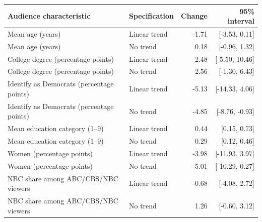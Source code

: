 \begin{tabular}{llrr}
\toprule
Audience characteristic & Specification & Change & 95\% interval \\
\midrule
Mean age (years) & Linear trend & -1.71 & [-3.53, 0.11] \\
Mean age (years) & No trend & 0.18 & [-0.96, 1.32] \\
College degree (percentage points) & Linear trend & 2.48 & [-5.50, 10.46] \\
College degree (percentage points) & No trend & 2.56 & [-1.30, 6.43] \\
Identify as Democrats (percentage points) & Linear trend & -5.13 & [-14.33, 4.06] \\
Identify as Democrats (percentage points) & No trend & -4.85 & [-8.76, -0.93] \\
Mean education category (1--9) & Linear trend & 0.44 & [0.15, 0.73] \\
Mean education category (1--9) & No trend & 0.29 & [0.12, 0.46] \\
Women (percentage points) & Linear trend & -3.98 & [-11.93, 3.97] \\
Women (percentage points) & No trend & -5.01 & [-10.29, 0.27] \\
NBC share among ABC/CBS/NBC viewers & Linear trend & -0.68 & [-4.08, 2.72] \\
NBC share among ABC/CBS/NBC viewers & No trend & 1.26 & [-0.60, 3.12] \\
\bottomrule
\end{tabular}
